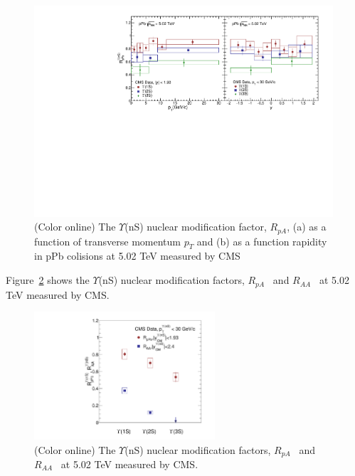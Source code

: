 \begin{figure}
  \includegraphics[width=0.99\textwidth]{Figures/ExpOverview/Fig_LHC_YnSRPPbPtRap.pdf}
     \caption{(Color online) The $\Upsilon$(nS) nuclear modification factor, $R_{pA}$,
      (a) as a function of transverse momentum $p_{T}$
    and (b) as a function rapidity in pPb colisions at 5.02 TeV measured by CMS~\cite{CMS:2022wfi}
  }
  \label{fig:LHCpPb5}
\end{figure}






Figure~\ref{fig:LHCpBPbPb} shows the $\Upsilon$(nS) nuclear modification factors,
    $R_{pA}$~\cite{CMS:2022wfi} and $R_{AA}$~\cite{CMS:2018zza}
    at 5.02 TeV measured by CMS.

\begin{figure}
\centering
  \includegraphics[width=0.60\textwidth]{Figures/ExpOverview/Fig_LHC_YnSRPPbRAAInt.pdf}
  \caption{(Color online) The $\Upsilon$(nS) nuclear modification factors,
    $R_{pA}$~\cite{CMS:2022wfi} and $R_{AA}$~\cite{CMS:2018zza}
    at 5.02 TeV measured by CMS.
  }
 \label{fig:LHCpBPbPb}
\end{figure}



  
